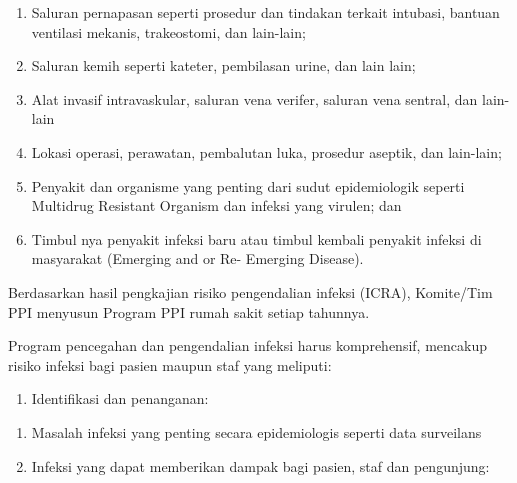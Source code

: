 \documentclass[
]{book}
\providecommand{\tightlist}{%
  \setlength{\itemsep}{0pt}\setlength{\parskip}{0pt}}
\begin{document}
\begin{enumerate}
\def\labelenumi{\alph{enumi}.}
\tightlist
\item
  Saluran pernapasan seperti prosedur dan tindakan terkait intubasi, bantuan ventilasi mekanis, trakeostomi, dan lain-lain;
\item
  Saluran kemih seperti kateter, pembilasan urine, dan lain lain;
\item
  Alat invasif intravaskular, saluran vena verifer, saluran vena sentral, dan lain-lain
\item
  Lokasi operasi, perawatan, pembalutan luka, prosedur aseptik, dan lain-lain;
\item
  Penyakit dan organisme yang penting dari sudut epidemiologik seperti Multidrug Resistant Organism dan infeksi yang virulen; dan
\item
  Timbul nya penyakit infeksi baru atau timbul kembali penyakit infeksi di masyarakat (Emerging and or Re- Emerging Disease).
\end{enumerate}

Berdasarkan hasil pengkajian risiko pengendalian infeksi (ICRA), Komite/Tim PPI menyusun Program PPI rumah sakit setiap tahunnya.

Program pencegahan dan pengendalian infeksi harus komprehensif, mencakup risiko infeksi bagi pasien maupun staf yang meliputi:

\begin{enumerate}
\def\labelenumi{\alph{enumi}.}
\tightlist
\item
  Identifikasi dan penanganan:
\end{enumerate}

\begin{enumerate}
\def\labelenumi{\arabic{enumi}.}
\tightlist
\item
  Masalah infeksi yang penting secara epidemiologis seperti data surveilans
\item
  Infeksi yang dapat memberikan dampak bagi pasien, staf dan pengunjung:
\end{enumerate}
\end{document}

